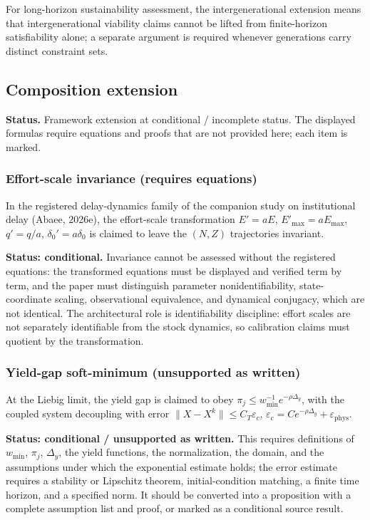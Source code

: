 \documentclass[preprint,11pt,authoryear]{elsarticle}
\theoremstyle{remark}
\begin{document}
For long-horizon sustainability assessment, the intergenerational extension means that intergenerational viability claims cannot be lifted from finite-horizon satisfiability alone; a separate argument is required whenever generations carry distinct constraint sets.

\subsection{Composition extension}

\noindent\textbf{Status.} Framework extension at conditional / incomplete status. The displayed formulas require equations and proofs that are not provided here; each item is marked.

\subsubsection{Effort-scale invariance (requires equations)}

In the registered delay-dynamics family of the companion study on institutional delay (Abaee, 2026e), the effort-scale transformation $E' = aE$, $E'_{\max} = aE_{\max}$, $q' = q/a$, $\delta_0' = a\delta_0$ is claimed to leave the $(N, Z)$ trajectories invariant.

\textbf{Status: conditional.} Invariance cannot be assessed without the registered equations: the transformed equations must be displayed and verified term by term, and the paper must distinguish parameter nonidentifiability, state-coordinate scaling, observational equivalence, and dynamical conjugacy, which are not identical. The architectural role is identifiability discipline: effort scales are not separately identifiable from the stock dynamics, so calibration claims must quotient by the transformation.

\subsubsection{Yield-gap soft-minimum (unsupported as written)}

At the Liebig limit, the yield gap is claimed to obey $\pi_j \le w_{\min}^{-1} e^{-\rho \Delta_y}$, with the coupled system decoupling with error $\|X - X^k\| \le C_T \varepsilon_c$, $\varepsilon_c = C e^{-\rho \Delta_y} + \varepsilon_{\mathrm{phys}}$.

\textbf{Status: conditional / unsupported as written.} This requires definitions of $w_{\min}$, $\pi_j$, $\Delta_y$, the yield functions, the normalization, the domain, and the assumptions under which the exponential estimate holds; the error estimate requires a stability or Lipschitz theorem, initial-condition matching, a finite time horizon, and a specified norm. It should be converted into a proposition with a complete assumption list and proof, or marked as a conditional source result.
\end{document}
